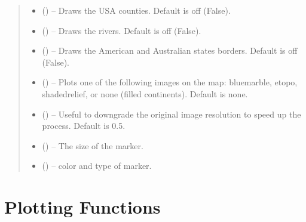 \documentclass[letterpaper,10pt,english]{sphinxmanual}
\begin{document}
\begin{fulllineitems}
\begin{quote}
\begin{description}
\begin{itemize}
\item {} 
 () -- Draws the USA counties. Default is off (False).

\item {} 
 () -- Draws the rivers. Default is off (False).

\item {} 
 () -- Draws the American and Australian states borders.
Default is off (False).

\item {} 
 () -- Plots one of the following images on the map:
bluemarble, etopo, shadedrelief, or none (filled continents).
Default is none.

\item {} 
 () -- Useful to downgrade the original image resolution to
speed up the process. Default is 0.5.

\item {} 
 () -- The size of the marker.

\item {} 
 () -- color and type of marker.

\end{itemize}

\end{description}\end{quote}

\end{fulllineitems}



\chapter{Plotting Functions}
\label{\detokenize{Plot::doc}}\label{\detokenize{Plot:plotting-functions}}
\end{document}
